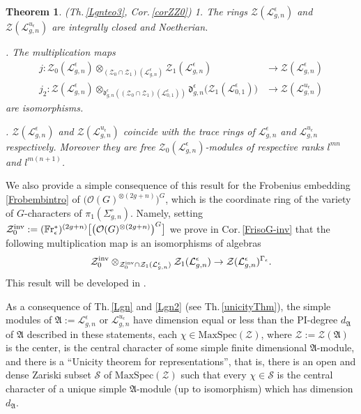 \documentclass[11pt]{amsart}
\newtheorem{teo}{Theorem}[section]
\newcommand{\e}{\epsilon}
\newcommand{\Ll}{\mathcal{L}}
\begin{document}
\begin{teo}\label{Lgn3} {\rm (Th.\,\ref{Lgnteo3}, Cor.\,\ref{corZZ0})} 1. The rings $\mathcal{Z}(\Ll_{g,n}^{\e})$ and $\mathcal{Z}(\Ll_{g,n}^{u_\e})$ are integrally closed and Noetherian.

. The multiplication maps
\begin{align*}
j\colon \mathcal{Z}_0(\mathcal{L}_{g,n}^{\e}) \otimes_{(\mathcal{Z}_0 \cap \mathcal{Z}_1)(\mathcal{L}_{g,n}^{\e})} \mathcal{Z}_1(\mathcal{L}_{g,n}^{\e}) & \to \mathcal{Z}(\Ll_{g,n}^{\e})\\ j_2\colon \mathcal{Z}(\Ll_{g,n}^{\e}) \otimes_{\mathfrak{d}_{g,n}^{\e}\left((\mathcal{Z}_0\cap \mathcal{Z}_1)(\Ll_{0,1}^\e)\right)} \mathfrak{d}_{g,n}^{\e}\bigl( \mathcal{Z}_1(\Ll_{0,1}^\e) \bigr)& \to \mathcal{Z}(\Ll_{g,n}^{u_\e})
\end{align*} are isomorphisms. 

. $\mathcal{Z}(\Ll_{g,n}^{\e})$ and $\mathcal{Z}(\Ll_{g,n}^{u_\e})$ coincide with the trace rings of $\Ll_{g,n}^{\e}$ and $\Ll_{g,n}^{u_\e}$ respectively. Moreover they are free $\mathcal{Z}_0(\Ll_{g,n}^{\e})$-modules of respective ranks $l^{mn}$ and $l^{m(n+1)}$.
\end{teo}
We also provide a simple consequence of this result for the Frobenius embedding \eqref{Frobembintro} of $\bigl(\mathcal{O}(G)^{\otimes (2g+n)}\bigr)^{G}$, which is the coordinate ring of the variety of $G$-characters of $\pi_1(\Sigma_{g,n}^{\circ})$. Namely, setting $\mathcal{Z}_0^{\rm inv}  := (\mathbb{F}\mathrm{r}_{\epsilon}^*)^{(2g+n)}\bigl[ \bigl(\mathcal{O}(G)^{\otimes (2g+n)}\bigr)^{G} \bigr]$ we prove in Cor.\,\ref{FrisoG-inv} that the following multiplication map is an isomorphisms of algebras
$$\mathcal{Z}_0^{\rm inv}  \otimes_{\mathcal{Z}_0^{\rm inv} \cap \mathcal{Z}_1(\mathcal{L}_{g,n}^{\e})}  \mathcal{Z}_1(\mathcal{L}_{g,n}^{\e}) \to \mathcal{Z}(\mathcal{L}_{g,n}^{\e})^{\Gamma_\e}.$$
This result will be developed in \cite{BF}.
\medskip

 As a consequence of Th.\,\ref{Lgn} and \ref{Lgn2} (see Th.\,\ref{unicityThm}), the simple modules of $\mathfrak{A} := \Ll_{g,n}^{\e}$ or $\Ll_{g,n}^{u_\e}$ have dimension equal or less than the PI-degree $d_\mathfrak{A}$ of $\mathfrak{A}$ described in these statements, each $\chi \in \mathrm{MaxSpec}(\mathcal{Z})$, where $\mathcal{Z}:= \mathcal{Z}(\mathfrak{A})$ is the center, is the central character of some simple finite dimensional $\mathfrak{A}$-module, and there is a ``Unicity theorem for representations'', that is, there is an open and dense Zariski subset $\mathcal{S}$ of $\mathrm{MaxSpec}(\mathcal{Z})$ such that every $\chi \in \mathcal{S}$ is the central character of a unique simple $\mathfrak{A}$-module (up to isomorphism) which has dimension $d_\mathfrak{A}$.
\end{document}
